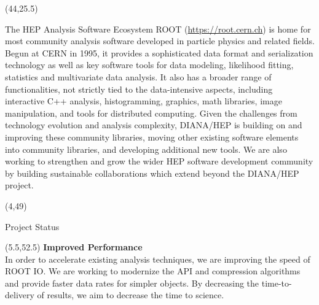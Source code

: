 \documentclass[final]{beamer}
\begin{document}
\begin{frame}{}
\begin{textblock}{38.0}(44,25.5)
\begin{block}{The HEP Analysis Software Ecosystem}
ROOT (\href{https://root.cern.ch}{https://root.cern.ch}) is
home for most community analysis
software developed in particle physics and related fields. Begun at CERN in 1995,
it provides a sophisticated data format and serialization technology
as well as key software tools for
data modeling, likelihood fitting, statistics and
multivariate data analysis. It also has a broader range of
functionalities, not strictly tied to the data-intensive aspects,
including interactive C++ analysis, histogramming,
graphics, math libraries, image manipulation,
and tools for distributed computing. 
Given the challenges from technology evolution and analysis complexity,
DIANA/HEP is building on and improving these
community libraries, moving other existing software elements into
community libraries, and developing additional new tools. We are also working to strengthen and grow the wider HEP software development community by building sustainable collaborations which extend beyond the DIANA/HEP project.
\end{block}
\end{textblock}





\begin{textblock}{78.0}(4,49)
\begin{block}{Project Status}
\end{block}
\end{textblock}

\begin{textblock}{22.5}(5.5,52.5)
\textcolor{mybluelabel}{\bf Improved Performance} \\
In order to accelerate existing analysis techniques, we are improving the speed of ROOT IO.
We are working to modernize the API and compression algorithms
and provide faster data rates for simpler objects.
By decreasing the time-to-delivery of results, we aim to decrease the time to science.
\end{textblock}


\end{frame}
\end{document}
